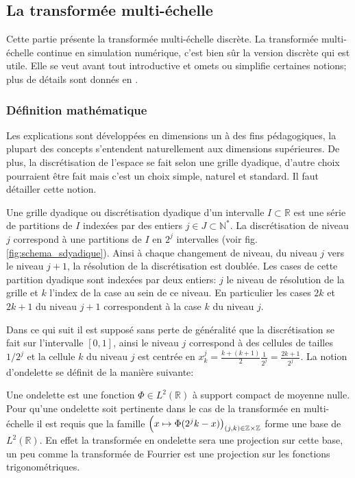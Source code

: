 \subsection{La transformée multi-échelle}
    Cette partie présente la transformée multi-échelle discrète. La transformée multi-échelle continue en simulation numérique,
    c'est bien sûr la version discrète qui est utile.
    Elle se veut avant tout introductive et omets ou simplifie certaines notions; plus de détails sont donnés en \cite{postePoly}.

    \subsubsection{Définition mathématique}
        Les explications sont développées en dimensions un à des fins pédagogiques, la plupart des concepts s'entendent naturellement aux dimensions supérieures. 
        De plus, la discrétisation de l'espace se fait selon une grille dyadique, d'autre choix pourraient être fait mais c'est un choix simple, naturel et standard.
        Il faut détailler cette notion.
        \begin{definition}
            Une grille dyadique ou discrétisation dyadique d'un intervalle $I \subset \mathbb R$ est une série de partitions de $I$ indexées 
            par des entiers $j \in J \subset \mathbb N^*$.
            La discrétisation de niveau $j$ correspond à une partitions de $I$ en $2^j$ intervalles (voir fig. \ref{fig:schema_sdyadique}). Ainsi à chaque changement de niveau, du niveau $j$ vers le niveau $j+1$,
            la résolution de la discrétisation est doublée. Les cases de cette partition dyadique sont indexées par deux entiers: $j$ le niveau de résolution de la grille
            et $k$ l'index de la case au sein de ce niveau. En particulier les cases $2k$ et $2k+1$ du niveau $j+1$ correspondent à la case $k$ du niveau $j$.
        \end{definition}
        
        Dans ce qui suit il est supposé sans perte de généralité que la discrétisation se fait sur l'intervalle $[0,1]$,
        ainsi le niveau $j$ correspond à des cellules de tailles $1/{2^j}$ et la cellule $k$ du niveau $j$ est centrée en
        $x_k^j = \frac{k+(k+1)}{2} \frac{1}{2^j} = \frac{2k+1}{2^j}.$
        La notion d'ondelette se définit de la manière suivante:
        \begin{definition}[Ondelette]
            Une ondelette est une fonction $\Phi \in L^2(\mathbb R)$ à support compact de moyenne nulle.
            Pour qu'une ondelette soit pertinente dans le cas de la transformée en multi-échelle il est requis
            que la famille $\Bigl(x \mapsto \Phi( 2^j k - x ) \bigr)_{ (j,k)\in \mathbb{Z} \times \mathbb{Z} }$ forme une base de $L^2(\mathbb{R})$.
            En effet la transformée en ondelette sera une projection sur cette base, un peu comme la transformée de Fourrier est une projection sur les 
            fonctions trigonométriques.
        \end{definition}
